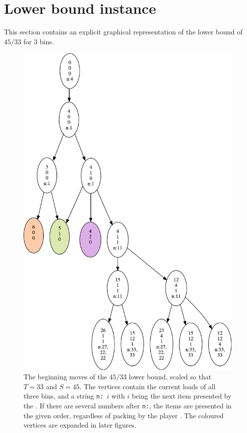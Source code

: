 \section{Lower bound instance}

This section contains an explicit graphical representation of the
lower bound of $45/33$ for $3$ bins.

\begin{figure}
  \centering
  \includegraphics[scale=0.65]{img/big_picture.pdf}
  \caption{The beginning moves of the $45/33$ lower bound, scaled so
      that $T = 33$ and $S = 45$. The vertices contain the current
      loads of all three bins, and a string \texttt{n: $i$} with $i$
      being the next item presented by the \adversary. If there are
      several numbers after \texttt{n:}, the items are presented in
      the given order, regardless of packing by the player \algo. The coloured vertices are expanded in later figures.}
\end{figure}

